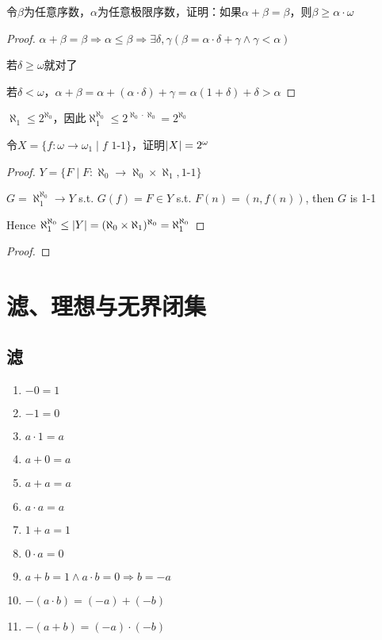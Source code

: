 \documentclass[11pt]{article}
\begin{document}
\begin{proposition}[]
令\(\beta\)为任意序数，\(\alpha\)为任意极限序数，证明：如果\(\alpha+\beta=\beta\)，则\(\beta\ge\alpha\cdot\omega\)
\end{proposition}

\begin{proof}
\(\alpha+\beta=\beta\Rightarrow\alpha\le\beta\Rightarrow\exists\delta,\gamma(\beta=\alpha\cdot\delta+\gamma\wedge\gamma<\alpha)\)

若\(\delta\ge\omega\)就对了

若\(\delta<\omega\)，\(\alpha+\beta=\alpha+(\alpha\cdot\delta)+\gamma=\alpha(1+\delta)+\delta>\alpha\)
\end{proof}

\(\aleph_1\le 2^{\aleph_0}\)，因此\(\aleph_1^{\aleph_0}\le 2^{\aleph_0\cdot\aleph_0}=2^{\aleph_0}\)

\begin{proposition}[]
令\(X=\{f:\omega\to\omega_1\mid f\text{ 1-1}\}\)，证明\(\abs{X}=2^\omega\)
\end{proposition}

\begin{proof}
\(Y=\{F\mid F:\aleph_0\to\aleph_0\times\aleph_1, \text{1-1}\}\)

\(G=\aleph_1^{\aleph_0}\to Y\) s.t. \(G(f)=F\in Y\) s.t. \(F(n)=(n,f(n))\), then \(G\) is 1-1

Hence \(\aleph_1^{\aleph_0}\le\abs{Y}=(\aleph_0\times\aleph_1)^{\aleph_0}=\aleph_1^{\aleph_0}\)
\end{proof}

\begin{proof}

\end{proof}



\section{滤、理想与无界闭集}
\label{sec:orga260981}
\subsection{滤}
\label{sec:orge68335d}
\begin{proposition}[]
\begin{enumerate}
\item \(-0=1\)
\item \(-1=0\)
\item \(a\cdot 1=a\)
\item \(a+0=a\)
\item \(a+a=a\)
\item \(a\cdot a=a\)
\item \(1+a=1\)
\item \(0\cdot a=0\)
\item \(a+b=1\wedge a\cdot b=0\Rightarrow b=-a\)
\item \(-(a\cdot b)=(-a)+(-b)\)
\item \(-(a+b)=(-a)\cdot(-b)\)
\end{enumerate}
\end{proposition}
\end{document}
